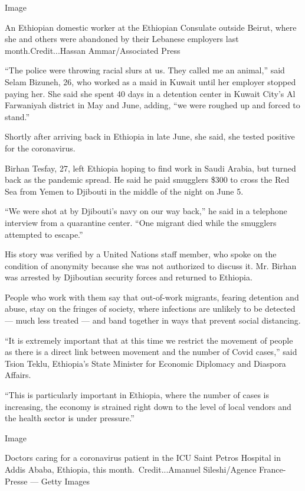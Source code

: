 Image

An Ethiopian domestic worker at the Ethiopian Consulate outside Beirut,
where she and others were abandoned by their Lebanese employers last
month.Credit...Hassan Ammar/Associated Press

``The police were throwing racial slurs at us. They called me an
animal,'' said Selam Bizuneh, 26, who worked as a maid in Kuwait until
her employer stopped paying her. She said she spent 40 days in a
detention center in Kuwait City's Al Farwaniyah district in May and
June, adding, ``we were roughed up and forced to stand.''

Shortly after arriving back in Ethiopia in late June, she said, she
tested positive for the coronavirus.

Birhan Tesfay, 27, left Ethiopia hoping to find work in Saudi Arabia,
but turned back as the pandemic spread. He said he paid smugglers \$300
to cross the Red Sea from Yemen to Djibouti in the middle of the night
on June 5.

``We were shot at by Djibouti's navy on our way back,'' he said in a
telephone interview from a quarantine center. ``One migrant died while
the smugglers attempted to escape.''

His story was verified by a United Nations staff member, who spoke on
the condition of anonymity because she was not authorized to discuss it.
Mr. Birhan was arrested by Djiboutian security forces and returned to
Ethiopia.

People who work with them say that out-of-work migrants, fearing
detention and abuse, stay on the fringes of society, where infections
are unlikely to be detected --- much less treated --- and band together
in ways that prevent social distancing.

``It is extremely important that at this time we restrict the movement
of people as there is a direct link between movement and the number of
Covid cases,'' said Tsion Teklu, Ethiopia's State Minister for Economic
Diplomacy and Diaspora Affairs.

``This is particularly important in Ethiopia, where the number of cases
is increasing, the economy is strained right down to the level of local
vendors and the health sector is under pressure.''

Image

Doctors caring for a coronavirus patient in the ICU Saint Petros
Hospital in Addis Ababa, Ethiopia, this month.~Credit...Amanuel
Sileshi/Agence France-Presse --- Getty Images

